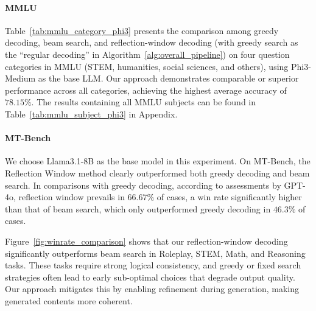 \paragraph{MMLU}
Table~\ref{tab:mmlu_category_phi3} presents the comparison among greedy decoding, beam search, and reflection-window decoding (with greedy search as the ``regular decoding'' in Algorithm~\ref{alg:overall_pipeline}) on four question categories in MMLU (STEM, humanities, social sciences, and others), using Phi3-Medium as the base LLM.
Our approach demonstrates comparable or superior performance across all categories, achieving the highest average accuracy of $78.15\%$.
The results containing all MMLU subjects can be found in Table~\ref{tab:mmlu_subject_phi3} in Appendix.



\paragraph{MT-Bench}
We choose Llama3.1-8B as the base model in this experiment.
On MT-Bench, the Reflection Window method clearly outperformed both greedy decoding and beam search.
In comparisons with greedy decoding, according to assessments by GPT-4o, reflection window prevails in $66.67\%$ of cases, a win rate significantly higher than that of beam search, which only outperformed greedy decoding in $46.3\%$ of cases.

Figure~\ref{fig:winrate_comparison} shows that our reflection-window decoding significantly outperforms beam search in Roleplay, STEM, Math, and Reasoning tasks.
These tasks require strong logical consistency, and greedy or fixed search strategies often lead to early sub-optimal choices that degrade output quality.
Our approach mitigates this by enabling refinement during generation, making generated contents more coherent.




